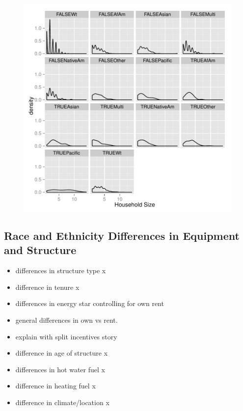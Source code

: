 \documentclass{article}
\begin{document}
\begin{figure}
\begin{center}\label{fig:HHbyRace}
\includegraphics{DraftEdwardsWoods-007}
\end{center}
\end{figure}


  \subsection{Race and Ethnicity Differences in Equipment and Structure}

\begin{itemize}
  \item differences in structure type x
  \item difference in tenure x
  \item differences in energy star controlling for own rent
  \item general differences in own vs rent.  
  \item explain with split incentives story
  \item difference in age of structure x
  \item differences in hot water fuel x
  \item difference in heating fuel x
    \item difference in climate/location x
\end{itemize}
  
\end{document}
